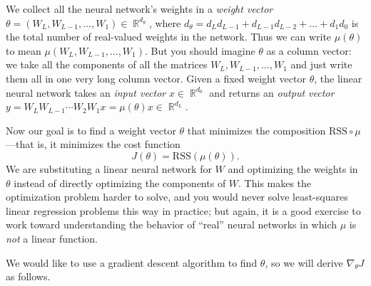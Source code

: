 \documentclass{article}
\DeclareMathOperator{\R}{\mathbb{R}}
\begin{document}
We collect all the neural network's weights in a {\em weight vector} $\theta = (W_L, W_{L - 1}, \ldots, W_1) \in \R^{d_\theta}$, where $d_\theta = d_L d_{L-1} + d_{L-1} d_{L-2} + \ldots + d_1 d_0$ is the total number of real-valued weights in the network.
Thus we can write $\mu(\theta)$ to mean $\mu(W_L, W_{L-1}, \ldots, W_1)$.
But you should imagine $\theta$ as a column vector: we take all the components of all the matrices $W_L, W_{L-1}, \ldots, W_1$ and just write them all in one very long column vector.
Given a fixed weight vector $\theta$, the linear neural network takes an {\em input vector} $x \in \R^{d_0}$ and returns an {\em output vector} $y = W_L W_{L-1} \cdots W_2 W_1 x = \mu(\theta) x \in \R^{d_L}$.

Now our goal is to find a weight vector $\theta$ that minimizes the composition $\mathrm{RSS} \circ \mu$---that is, it minimizes the cost function
\[
    J(\theta) = \mathrm{RSS}(\mu(\theta)).
\]
We are substituting a linear neural network for $W$ and optimizing the weights in $\theta$ instead of directly optimizing the components of $W$.
This makes the optimization problem harder to solve, and you would never solve least-squares linear regression problems this way in practice;
but again, it is a good exercise to work toward understanding the behavior of ``real'' neural networks in which $\mu$ is {\em not} a linear function.

We would like to use a gradient descent algorithm to find $\theta$, so we will derive $\nabla_\theta J$ as follows.
\end{document}
